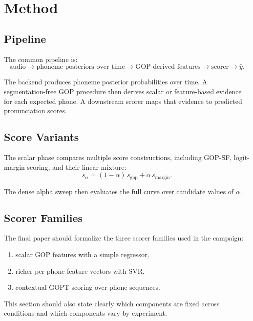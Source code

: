 \section{Method}

\subsection{Pipeline}

The common pipeline is:
\begin{equation}
\text{audio} \rightarrow \text{phoneme posteriors over time} \rightarrow \text{GOP-derived features} \rightarrow \text{scorer} \rightarrow \hat{y}.
\end{equation}

The backend produces phoneme posterior probabilities over time. A
segmentation-free GOP procedure then derives scalar or feature-based evidence
for each expected phone. A downstream scorer maps that evidence to predicted
pronunciation scores.

\subsection{Score Variants}

The scalar phase compares multiple score constructions, including GOP-SF,
logit-margin scoring, and their linear mixture:
\begin{equation}
s_{\alpha} = (1 - \alpha)\, s_{\mathrm{gop}} + \alpha\, s_{\mathrm{margin}}.
\end{equation}

The dense alpha sweep then evaluates the full curve over candidate values of
$\alpha$.

\subsection{Scorer Families}

The final paper should formalize the three scorer families used in the campaign:

\begin{enumerate}
  \item scalar GOP features with a simple regressor,
  \item richer per-phone feature vectors with SVR,
  \item contextual GOPT scoring over phone sequences.
\end{enumerate}

This section should also state clearly which components are fixed across
conditions and which components vary by experiment.
